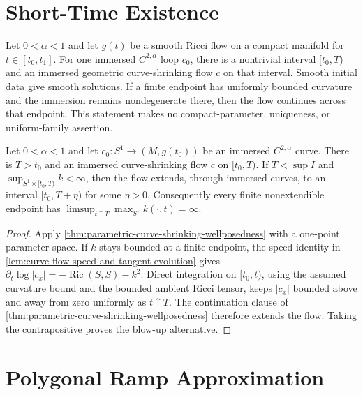 \section{Short-Time Existence}

\begin{theorem}
\label{thm:parametric-curve-shrinking-wellposedness}
\notready
Let $0<\alpha<1$ and let $g(t)$ be a smooth Ricci flow on a compact
manifold for $t\in[t_0,t_1]$.  For one immersed $C^{2,\alpha}$ loop
$c_0$, there is a nontrivial interval $[t_0,T)$ and an immersed geometric
curve-shrinking flow $c$ on that interval.  Smooth initial data give smooth
solutions.  If a finite endpoint has uniformly bounded curvature and the
immersion remains nondegenerate there, then the flow continues across that
endpoint.  This statement makes no compact-parameter, uniqueness, or
uniform-family assertion.
\end{theorem}

\begin{theorem}
\label{thm:curve-shrinking-short-time-existence}
\notready
Let $0<\alpha<1$ and let
$c_0\colon S^1\to(M,g(t_0))$ be an immersed $C^{2,\alpha}$ curve.  There is
$T>t_0$ and an immersed curve-shrinking flow $c$ on $[t_0,T)$.  If
$T<\sup I$
and $\sup_{S^1\times[t_0,T)}k<\infty$, then the flow extends, through
immersed curves, to an interval $[t_0,T+\eta)$ for some $\eta>0$.
Consequently every finite nonextendible endpoint has
$\limsup_{t\uparrow T}\max_{S^1}k(\cdot,t)=\infty$.
\end{theorem}
\begin{proof}
Apply \ref{thm:parametric-curve-shrinking-wellposedness} with a one-point
parameter space.  If $k$ stays bounded at a finite endpoint, the speed
identity in \ref{lem:curve-flow-speed-and-tangent-evolution} gives
$\partial_t\log|c_x|=-\operatorname{Ric}(S,S)-k^2$.  Direct integration on
$[t_0,t)$, using the assumed curvature bound and the bounded ambient Ricci
tensor, keeps $|c_x|$ bounded above and away from zero uniformly as
$t\uparrow T$.
The continuation clause of
\ref{thm:parametric-curve-shrinking-wellposedness} therefore extends the flow.
Taking the contrapositive proves the blow-up alternative.
\end{proof}

\section{Polygonal Ramp Approximation}

